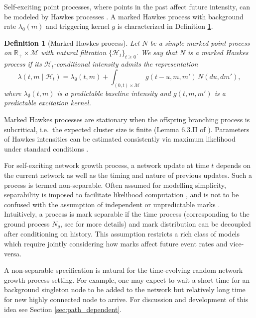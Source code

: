 \documentclass[12pt]{article}
\newtheorem{definition}[theorem]{Definition}
\begin{document}
Self-exciting point processes, where points in the past affect future intensity, can be modeled by Hawkes processes \citep{Hawkes1971}. A marked Hawkes process with background rate $\lambda_0(m)$ and triggering kernel $g$ is characterized in Definition \ref{def:mpp_hawkes}.

\begin{definition}[Marked Hawkes process]\label{def:mpp_hawkes}
Let $N$ be a simple marked point process on $\mathbb{R}_+ \times \mathcal{M}$ with
natural filtration $\{\mathcal{H}_t\}_{t \ge 0}$.  
We say that $N$ is a \emph{marked Hawkes process} if its
$\mathcal{H}_t$-conditional intensity admits the representation
\begin{equation}
\lambda(t,m \mid \mathcal{H}_t)
=
\lambda_{\emptyset}(t,m)
+
\int_{(0,t)\times\mathcal{M}}
g\!\left(t-u, m,m'\right)\,
N(du,dm'),
\label{eq:path_dependent_marked_hawkes}
\end{equation}
where $\lambda_{\emptyset}(t,m)$ is a predictable baseline intensity and
$g(t,m,m')$ is a predictable excitation kernel.
\end{definition}

Marked Hawkes processes are stationary when the offspring branching process is subcritical, i.e.\ the expected cluster size is finite (Lemma 6.3.II of \citealp{daley2007introduction}). Parameters of Hawkes intensities can be estimated consistently via maximum likelihood under standard conditions \citep{rathbun1996,schoenberg2016note,ogata1978estimators}.


For self-exciting network growth process, a network update at time $t$ depends on the current network as well as the timing and nature of previous updates. Such a process is termed non-separable. Often assumed for modelling simplicity, separability is imposed to facilitate likelihood computation \citep{davis2024multivariate,spassiani2024distribution}, and is not to be confused with the assumption of independent or unpredictable marks \citep{daley2007introduction}. Intuitively, a process is mark separable if the time process (corresponding to the ground process $N_g$, see \cite{daley2003introduction} for more details) and mark distribution can be decoupled after conditioning on history. This assumption restricts a rich class of models which require jointly considering how marks affect future event rates and vice-versa.

A non-separable specification is natural for the time-evolving random network growth process setting. For example, one may expect to wait a short time for an background singleton node to be added to the network but relatively long time for new highly connected node to arrive. For discussion and development of this idea see Section \ref{sec:path_dependent}.
\end{document}
